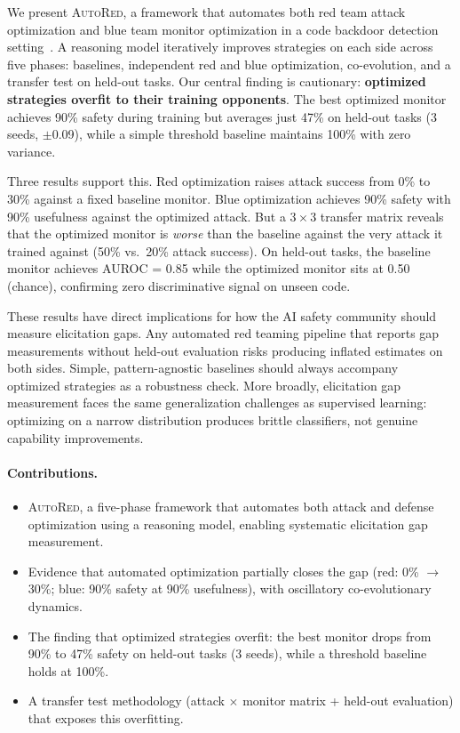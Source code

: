 \documentclass{article}
\newcommand{\ours}{\textsc{AutoRed}}
\begin{document}
We present \ours{}, a framework that automates both red team attack optimization and blue team monitor optimization in a code backdoor detection setting~\citep{greenblatt2024ai}. A reasoning model iteratively improves strategies on each side across five phases: baselines, independent red and blue optimization, co-evolution, and a transfer test on held-out tasks. Our central finding is cautionary: \textbf{optimized strategies overfit to their training opponents}. The best optimized monitor achieves 90\% safety during training but averages just 47\% on held-out tasks (3 seeds, $\pm$0.09), while a simple threshold baseline maintains 100\% with zero variance.

Three results support this. Red optimization raises attack success from 0\% to 30\% against a fixed baseline monitor. Blue optimization achieves 90\% safety with 90\% usefulness against the optimized attack. But a $3 \times 3$ transfer matrix reveals that the optimized monitor is \emph{worse} than the baseline against the very attack it trained against (50\% vs.\ 20\% attack success). On held-out tasks, the baseline monitor achieves AUROC = 0.85 while the optimized monitor sits at 0.50 (chance), confirming zero discriminative signal on unseen code.

These results have direct implications for how the AI safety community should measure elicitation gaps. Any automated red teaming pipeline that reports gap measurements without held-out evaluation risks producing inflated estimates on both sides. Simple, pattern-agnostic baselines should always accompany optimized strategies as a robustness check. More broadly, elicitation gap measurement faces the same generalization challenges as supervised learning: optimizing on a narrow distribution produces brittle classifiers, not genuine capability improvements.

\paragraph{Contributions.}
\begin{itemize}[nosep,left=0pt]
    \item \ours{}, a five-phase framework that automates both attack and defense optimization using a reasoning model, enabling systematic elicitation gap measurement.
    \item Evidence that automated optimization partially closes the gap (red: 0\% $\to$ 30\%; blue: 90\% safety at 90\% usefulness), with oscillatory co-evolutionary dynamics.
    \item The finding that optimized strategies overfit: the best monitor drops from 90\% to 47\% safety on held-out tasks (3 seeds), while a threshold baseline holds at 100\%.
    \item A transfer test methodology (attack $\times$ monitor matrix + held-out evaluation) that exposes this overfitting.
\end{itemize}
\end{document}
